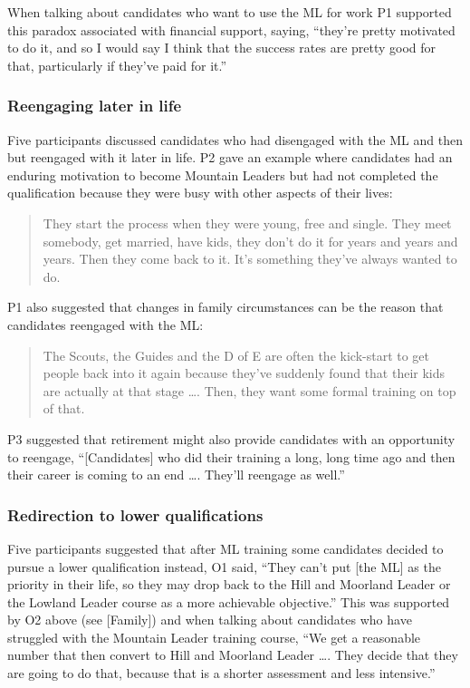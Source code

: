 \documentclass[a4paper,]{book}
\begin{document}
When talking about candidates who want to use the ML for work P1 supported this paradox associated with financial support, saying, ``they're pretty motivated to do it, and so I would say I think that the success rates are pretty good for that, particularly if they've paid for it.''

\hypertarget{reengaging-later-in-life}{%
\subsubsection{Reengaging later in life}\label{reengaging-later-in-life}}

Five participants discussed candidates who had disengaged with the ML and then but reengaged with it later in life. P2 gave an example where candidates had an enduring motivation to become Mountain Leaders but had not completed the qualification because they were busy with other aspects of their lives:

\begin{quote}
They start the process when they were young, free and single. They meet somebody, get married, have kids, they don't do it for years and years and years. Then they come back to it. It's something they've always wanted to do.
\end{quote}

P1 also suggested that changes in family circumstances can be the reason that candidates reengaged with the ML:

\begin{quote}
The Scouts, the Guides and the D of E are often the kick-start to get people back into it again because they've suddenly found that their kids are actually at that stage \ldots{}. Then, they want some formal training on top of that.
\end{quote}

P3 suggested that retirement might also provide candidates with an opportunity to reengage, ``{[}Candidates{]} who did their training a long, long time ago and then their career is coming to an end \ldots{}. They'll reengage as well.''

\hypertarget{redirection-to-lower-qualifications}{%
\subsubsection{Redirection to lower qualifications}\label{redirection-to-lower-qualifications}}

Five participants suggested that after ML training some candidates decided to pursue a lower qualification instead, O1 said, ``They can't put {[}the ML{]} as the priority in their life, so they may drop back to the Hill and Moorland Leader or the Lowland Leader course as a more achievable objective.'' This was supported by O2 above (see {[}Family{]}) and when talking about candidates who have struggled with the Mountain Leader training course, ``We get a reasonable number that then convert to Hill and Moorland Leader \ldots{}. They decide that they are going to do that, because that is a shorter assessment and less intensive.''
\end{document}
